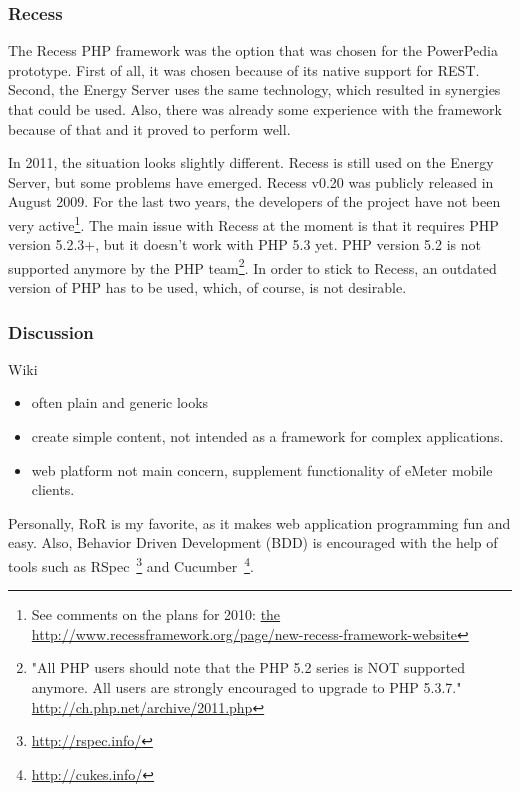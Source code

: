 \subsubsection{Recess}
The Recess PHP framework was the option that was chosen for the PowerPedia prototype. First of all, it was chosen because of its native support for REST. Second, the Energy Server uses the same technology, which resulted in synergies that could be used. Also, there was already some experience with the framework because of that and it proved to perform well.

In 2011, the situation looks slightly different. Recess is still used on the Energy Server, but some problems have emerged. Recess v0.20 was publicly released in August 2009. For the last two years, the developers of the project have not been very active\footnote{See comments on the plans for 2010: \url{the http://www.recessframework.org/page/new-recess-framework-website}}. The main issue with Recess at the moment is that it requires PHP version 5.2.3+, but it doesn't work with PHP 5.3 yet. PHP version 5.2 is not supported anymore by the PHP team\footnote{"All PHP users should note that the PHP 5.2 series is NOT supported anymore. All users are strongly encouraged to upgrade to PHP 5.3.7." \url{http://ch.php.net/archive/2011.php}}. In order to stick to Recess, an outdated version of PHP has to be used, which, of course, is not desirable.   

\subsubsection{Discussion}
Wiki
\begin{itemize}
\item often plain and generic looks
\item create simple content, not intended as a framework for complex applications. 
\item web platform not main concern, supplement functionality of eMeter mobile clients.
\end{itemize}

Personally, RoR is my favorite, as it makes web application programming fun and easy. Also, Behavior Driven Development (BDD) is encouraged  with the help of tools such as RSpec~\footnote{\url{http://rspec.info/}} and Cucumber~\footnote{\url{http://cukes.info/}}.


